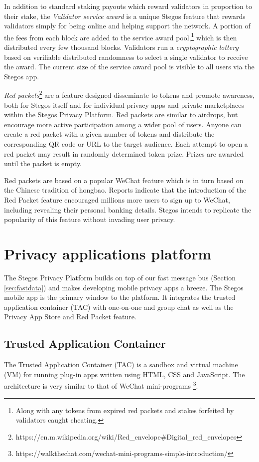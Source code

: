 \documentclass[8pt,fleqn,openany]{book}
\begin{document}
In addition to standard staking payouts which reward validators in proportion to their stake, the \textit{Validator service award} is a unique Stegos feature that rewards validators simply for being online and helping support the network. A portion of the fees from each block are added to the service award pool,\footnote{Along with any tokens from expired red packets and stakes forfeited by validators caught cheating.} which is then distributed every few thousand blocks. Validators run a \textit{cryptographic lottery} based on verifiable distributed randomness to select a single validator to receive the award. The current size of the service award pool is visible to all users via the Stegos app.

\textit{Red packets}\footnote{https://en.m.wikipedia.org/wiki/Red\_envelope\#Digital\_red\_envelopes} are a feature designed disseminate to tokens and promote awareness, both for Stegos itself and for individual privacy apps and private marketplaces within the Stegos Privacy Platform. Red packets are similar to airdrops, but encourage more active participation among a wider pool of users. Anyone can create a red packet with a given number of tokens and distribute the corresponding QR code or URL to the target audience. Each attempt to open a red packet may result in randomly determined token prize. Prizes are awarded until the packet is empty. 

Red packets are based on a popular WeChat feature which is in turn based on the Chinese tradition of hongbao. Reports indicate that the introduction of the Red Packet feature encouraged millions more users to sign up to WeChat, including revealing their personal banking details. Stegos intends to replicate the popularity of this feature without invading user privacy.
		
\chapter{Privacy applications platform}\label{chap:privacy-app-platform}
The Stegos Privacy Platform builds on top of our fast message bus (Section \ref{sec:fastdata}) and makes developing mobile privacy apps a breeze. The Stegos mobile app is the primary window to the platform. It integrates the trusted application container (TAC) with one-on-one and group chat as well as the Privacy App Store and Red Packet feature. 

\section{Trusted Application Container}\label{sec:tac}
The Trusted Application Container (TAC) is a sandbox and virtual machine (VM) for running plug-in apps written using HTML, CSS and JavaScript. The architecture is very similar to that of WeChat mini-programs \footnote{https://walkthechat.com/wechat-mini-programs-simple-introduction/}.
\end{document}
